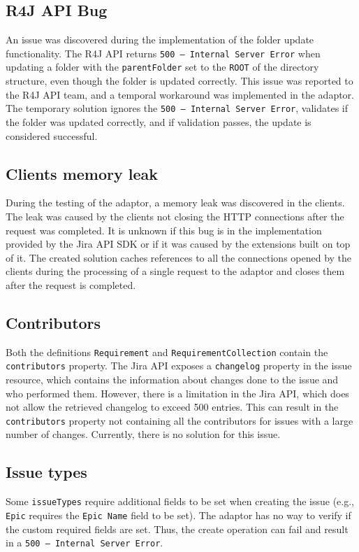 \subsection*{R4J API Bug}
\label{sec:r4j_api_bug}
An issue was discovered during the implementation of the folder update functionality. The R4J API returns \texttt{500 -- Internal Server Error} when updating a folder with the \texttt{parentFolder} set to the \texttt{ROOT} of the directory structure, even though the folder is updated correctly. This issue was reported to the R4J API team, and a temporal workaround was implemented in the adaptor. The temporary solution ignores the \texttt{500 -- Internal Server Error}, validates if the folder was updated correctly, and if validation passes, the update is considered successful.

\subsection*{Clients memory leak}
During the testing of the adaptor, a memory leak was discovered in the clients. The leak was caused by the clients not closing the HTTP connections after the request was completed. It is unknown if this bug is in the implementation provided by the Jira API SDK or if it was caused by the extensions built on top of it. The created solution caches references to all the connections opened by the clients during the processing of a single request to the adaptor and closes them after the request is completed.

\subsection*{Contributors}
Both the definitions \texttt{Requirement} and \texttt{RequirementCollection} contain the \texttt{contributors} property. The Jira API exposes a \texttt{changelog} property in the issue resource, which contains the information about changes done to the issue and who performed them. However, there is a limitation in the Jira API, which does not allow the retrieved changelog to exceed 500 entries. This can result in the \texttt{contributors} property not containing all the contributors for issues with a large number of changes. Currently, there is no solution for this issue.

\subsection*{Issue types}
Some \texttt{issueTypes} require additional fields to be set when creating the issue (e.g., \texttt{Epic} requires the \texttt{Epic Name} field to be set). The adaptor has no way to verify if the custom required fields are set. Thus, the create operation can fail and result in a \texttt{500 -- Internal Server Error}.

